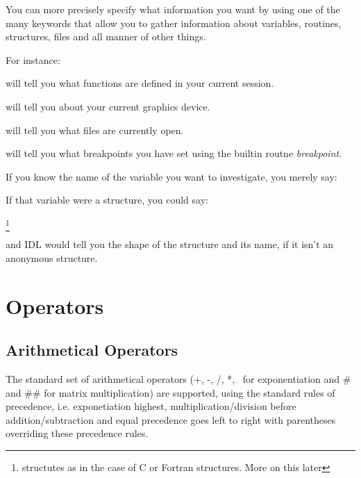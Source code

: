   You can more precisely specify what information you want by using
  one of the many keywords that allow you to gather information about
  variables, routines, structures, files and all manner of other
  things.

  For instance:



  will tell you what functions are defined in your current session.

   

   will tell you about your current graphics device.


   will tell you what files are currently open.


   will tell you what breakpoints you have set using the builtin
   routne \textit{breakpoint}.



  If you know the name of the variable you want to investigate, you
  merely say:


  If that variable were a structure, you could say:

  \footnote{structutes as in the
  case of C or Fortran structures. More on this later}

   and IDL would tell you the shape of the structure and its name, if
   it isn't an anonymous structure.
  

\section{Operators}\label{sec:qs-operators}

\subsection{Arithmetical Operators}
\label{sec:qs-arithmetical-operators}

  The standard set of arithmetical operators (+, -, /, *, \IEXP\ for
  exponentiation and \# and \#\# for matrix multiplication) are
  supported, using the standard rules of precedence,
  i.e. exponetiation highest, multiplication/division before
  addition/subtraction and equal precedence goes left to right with
  parentheses overriding these precedence rules.

